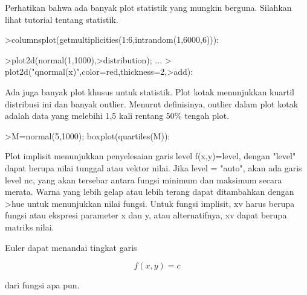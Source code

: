\documentclass{article}
\begin{document}
\begin{eulernotebook}
\begin{eulercomment}
\begin{eulercomment}
\begin{eulercomment}
\begin{eulercomment}
\begin{eulercomment}
Perhatikan bahwa ada banyak plot statistik yang mungkin berguna.
Silahkan lihat tutorial tentang statistik.
\end{eulercomment}
\begin{eulerprompt}
>columnsplot(getmultiplicities(1:6,intrandom(1,6000,6))):
\end{eulerprompt}
\begin{eulerprompt}
>plot2d(normal(1,1000),>distribution); ...
>  plot2d("qnormal(x)",color=red,thickness=2,>add):
\end{eulerprompt}
\begin{eulercomment}
Ada juga banyak plot khusus untuk statistik. Plot kotak menunjukkan
kuartil distribusi ini dan banyak outlier. Menurut definisinya,
outlier dalam plot kotak adalah data yang melebihi 1,5 kali rentang
50\% tengah plot.
\end{eulercomment}
\begin{eulerprompt}
>M=normal(5,1000); boxplot(quartiles(M)):
\end{eulerprompt}
\begin{eulercomment}
Plot implisit menunjukkan penyelesaian garis level f(x,y)=level,
dengan "level" dapat berupa nilai tunggal atau vektor nilai. Jika
level = "auto", akan ada garis level nc, yang akan tersebar antara
fungsi minimum dan maksimum secara merata. Warna yang lebih gelap atau
lebih terang dapat ditambahkan dengan \textgreater{}hue untuk menunjukkan nilai
fungsi. Untuk fungsi implisit, xv harus berupa fungsi atau ekspresi
parameter x dan y, atau alternatifnya, xv dapat berupa matriks nilai.

Euler dapat menandai tingkat garis

\end{eulercomment}
\begin{eulerformula}
\[
f(x,y) = c
\]
\end{eulerformula}
\begin{eulercomment}
dari fungsi apa pun.


\end{eulercomment}
\end{eulercomment}
\end{eulercomment}
\end{eulercomment}
\end{eulercomment}
\end{eulernotebook}
\end{document}
